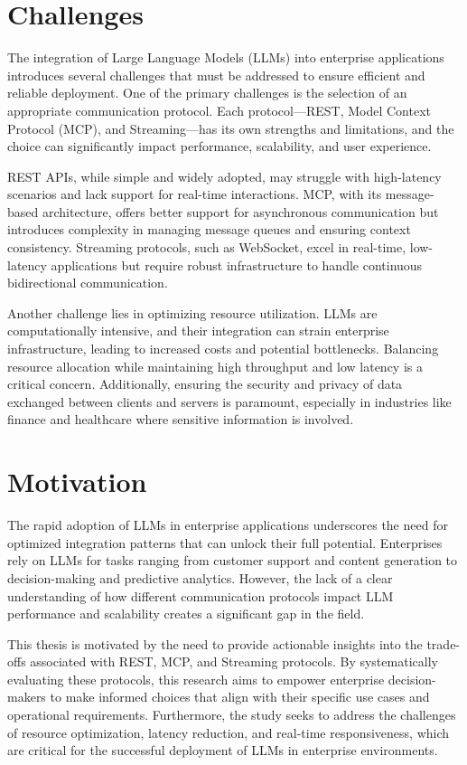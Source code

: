 \chapter{Challenges}
The integration of Large Language Models (LLMs) into enterprise applications introduces several challenges that must be addressed to ensure efficient and reliable deployment. One of the primary challenges is the selection of an appropriate communication protocol. Each protocol—REST, Model Context Protocol (MCP), and Streaming—has its own strengths and limitations, and the choice can significantly impact performance, scalability, and user experience.

REST APIs, while simple and widely adopted, may struggle with high-latency scenarios and lack support for real-time interactions. MCP, with its message-based architecture, offers better support for asynchronous communication but introduces complexity in managing message queues and ensuring context consistency. Streaming protocols, such as WebSocket, excel in real-time, low-latency applications but require robust infrastructure to handle continuous bidirectional communication.

Another challenge lies in optimizing resource utilization. LLMs are computationally intensive, and their integration can strain enterprise infrastructure, leading to increased costs and potential bottlenecks. Balancing resource allocation while maintaining high throughput and low latency is a critical concern. Additionally, ensuring the security and privacy of data exchanged between clients and servers is paramount, especially in industries like finance and healthcare where sensitive information is involved.

\chapter{Motivation}
The rapid adoption of LLMs in enterprise applications underscores the need for optimized integration patterns that can unlock their full potential. Enterprises rely on LLMs for tasks ranging from customer support and content generation to decision-making and predictive analytics. However, the lack of a clear understanding of how different communication protocols impact LLM performance and scalability creates a significant gap in the field.

This thesis is motivated by the need to provide actionable insights into the trade-offs associated with REST, MCP, and Streaming protocols. By systematically evaluating these protocols, this research aims to empower enterprise decision-makers to make informed choices that align with their specific use cases and operational requirements. Furthermore, the study seeks to address the challenges of resource optimization, latency reduction, and real-time responsiveness, which are critical for the successful deployment of LLMs in enterprise environments.

